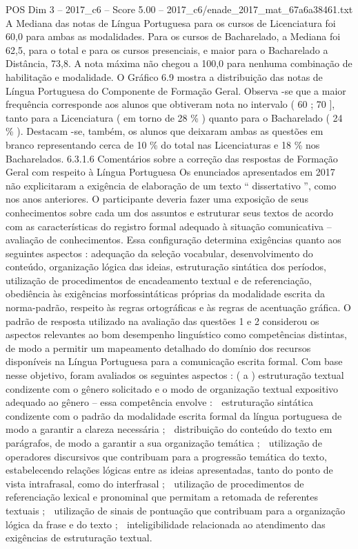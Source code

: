 \begin{textsample}{POS Dim 3 – 2017\_c6 – Score 5.00 – 2017\_c6/enade\_2017\_mat\_67a6a38461.txt}
A Mediana das notas de Língua Portuguesa para os cursos de Licenciatura foi 60,0 para ambas as modalidades.
Para os cursos de Bacharelado, a Mediana foi 62,5, para o total e para os cursos presenciais, e maior para o Bacharelado a Distância, 73,8.
A nota máxima não chegou a 100,0 para nenhuma combinação de habilitação e modalidade.
O Gráfico 6.9 mostra a distribuição das notas de Língua Portuguesa do Componente de Formação Geral.
Observa -se que a maior frequência corresponde aos alunos que obtiveram nota no intervalo ( 60 ; 70 ], tanto para a Licenciatura ( em torno de 28 \% ) quanto para o Bacharelado ( 24 \% ).
Destacam -se, também, os alunos que deixaram ambas as questões em branco representando cerca de 10 \% do total nas Licenciaturas e 18 \% nos Bacharelados. 6.3.1.6 Comentários sobre a correção das respostas de Formação Geral com respeito à Língua Portuguesa Os enunciados apresentados em 2017 não explicitaram a exigência de elaboração de um texto “ dissertativo ”, como nos anos anteriores.
O participante deveria fazer uma exposição de seus conhecimentos sobre cada um dos assuntos e estruturar seus textos de acordo com as características do registro formal adequado à situação comunicativa – avaliação de conhecimentos.
Essa configuração determina exigências quanto aos seguintes aspectos : adequação da seleção vocabular, desenvolvimento do conteúdo, organização lógica das ideias, estruturação sintática dos períodos, utilização de procedimentos de encadeamento textual e de referenciação, obediência às exigências morfossintáticas próprias da modalidade escrita da norma-padrão, respeito às regras ortográficas e às regras de acentuação gráfica.
O padrão de resposta utilizado na avaliação das questões 1 e 2 considerou os aspectos relevantes ao bom desempenho linguístico como competências distintas, de modo a permitir um mapeamento detalhado do domínio dos recursos disponíveis na Língua Portuguesa para a comunicação escrita formal.
Com base nesse objetivo, foram avaliados os seguintes aspectos : ( a ) estruturação textual condizente com o gênero solicitado e o modo de organização textual expositivo adequado ao gênero – essa competência envolve :  estruturação sintática condizente com o padrão da modalidade escrita formal da língua portuguesa de modo a garantir a clareza necessária ;  distribuição do conteúdo do texto em parágrafos, de modo a garantir a sua organização temática ;  utilização de operadores discursivos que contribuam para a progressão temática do texto, estabelecendo relações lógicas entre as ideias apresentadas, tanto do ponto de vista intrafrasal, como do interfrasal ;  utilização de procedimentos de referenciação lexical e pronominal que permitam a retomada de referentes textuais ;  utilização de sinais de pontuação que contribuam para a organização lógica da frase e do texto ;  inteligibilidade relacionada ao atendimento das exigências de estruturação textual.

\end{textsample}

